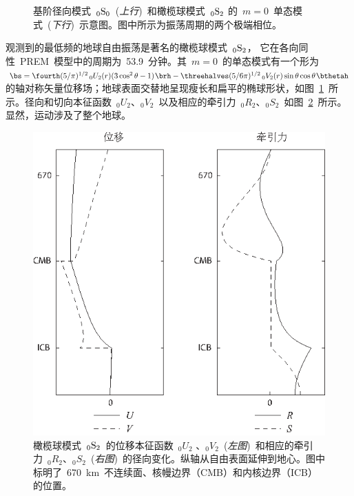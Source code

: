 {\begin{figure}[!t]
\begin{center}
{}
\end{center}
\caption[0S2 mode]{\label{fig:0S0&0S2}
基阶径向模式~${}_0{\rm S}_0$~({\em 上行\/})~和橄榄球模式~${}_0{\rm S}_2$ 的~$m=0$~单态模式~({\em 下行\/})~示意图。图中所示为振荡周期的两个极端相位。
}
\end{figure}

观测到的最低频的地球自由振荡是著名的橄榄球模式~${}_0{\rm S}_2$，
%
%
%
它在各向同性~PREM~模型中的周期为~53.9~分钟。其~$m=0$~的单态模式有一个形为~$\bs=\fourth(5/\pi)^{1/2}\,{}_0U_2(r)
(3\cos^2\theta-1)\hspace{0.3 mm}\brh
-\threehalves(5/6\pi)^{1/2}\,{}_0V_2(r)
\sin\theta\cos\theta\hspace{0.3 mm}\bthetah$的轴对称矢量位移场；地球表面交替地呈现瘦长和扁平的椭球形状，如图~\ref{fig:0S0&0S2}~所示。径向和切向本征函数~${}_0U_2$、${}_0V_2$~以及相应的牵引力~${}_0R_2$、${}_0S_2$~如图~\ref{fig:0S2}~所示。显然，运动涉及了整个地球。
\begin{figure}[!t]
\begin{center}
\includegraphics{../figures/chap08/fig18.eps}
\end{center}
\caption[0S2 mode]{\label{fig:0S2}
橄榄球模式~${}_0{\rm S}_2$~的位移本征函数~${}_0U_2$ 、${}_0V_2$~({\em 左图\/})~和相应的牵引力~${}_0R_2$、${}_0S_2$~({\em 右图\/})~的径向变化。纵轴从自由表面延伸到地心。图中标明了~670~km~不连续面、核幔边界（CMB）和内核边界（ICB）的位置。
}
\end{figure}
\enlargethispage{-0.5mm}

}
